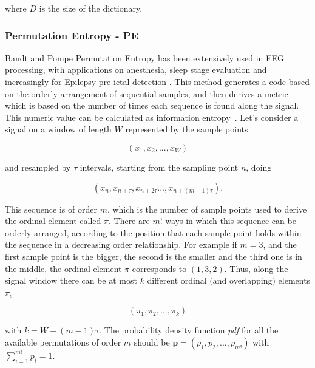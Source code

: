 \noindent where $D$ is the size of the dictionary.  



\subsubsection{Permutation Entropy - PE}

Bandt and Pompe Permutation Entropy has been extensively used in EEG processing, with applications on anesthesia, sleep stage evaluation and increasingly for Epilepsy pre-ictal detection \cite{Bandt2002}.  This method generates a code based on the orderly arrangement of sequential samples, and then derives a metric which is based on the number of times each sequence is found along the signal.  This numeric value can be calculated as information entropy~\cite{Nicolaou2010}. Let's consider a signal on a window of length $W$ represented by the sample points

\begin{equation}
(x_1,x_2,...,x_{W})
\label{eq:pesignal}
\end{equation}

\noindent and resampled by $\tau$ intervals, starting from the sampling point $n$, doing

\begin{equation}
(x_n,x_{n+\tau},x_{n+2 \tau}...,x_{n+(m-1)\tau}).
\label{eq:pe2}
\end{equation}

This sequence is of order $m$, which is the number of sample points used to derive the ordinal element called $\pi$. There are $m!$ ways in which this sequence can be orderly arranged, according to the position that each sample point holds within the sequence in a decreasing order relationship.  For example if $m=3$, and the first sample point is the bigger, the second is the smaller and the third one is in the middle, the ordinal element $\pi$ corresponds to $(1,3,2)$. Thus, along the signal window there can be at most $k$ different ordinal (and overlapping) elements $\pi_{s}$

\begin{equation}
(\pi_{1},\pi_{2},...,\pi_{k})
\label{eq:pe3}
\end{equation}

\noindent with $k = W-(m-1) \tau$.  The probability density function \textit{pdf} for all the available permutations of order $m$ should be $ \textbf{p} = (p_1,p_2,...,p_{m!}) $ with $ \sum_{i=1}^{m!} p_{i} = 1 $.

